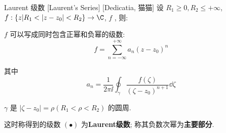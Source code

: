 \documentclass[UTF8]{ctexart}
\begin{document}
        \begin{thm}
            {Laurent 级数}
            [Laurent's Series]
            [Dedicatia, 猫猫]
            设 \(R_1\geq 0, R_2\leq+\infty\), \(f:\{z|R_1<|z-z_0|<R_2\}\to\C\), \(f\) , 则: 
            
            \(f\) 可以写成同时包含正幂和负幂的级数: 
            \[f=\sum_{n=-\infty}^{+\infty}a_n(z-z_0)^n\tag{ \(\bullet\) }\]
            
            其中
            \[a_n=\frac{1}{2\pi\ii}\oint_{\gamma}\frac{f(\zeta)}{(\zeta-z_0)^{n+1}}\dd{\zeta}\]
            
            \(\gamma\) 是 \(|\zeta-z_0|=\rho(R_1<\rho< R_2)\) 的圆周. 
            
            这时称得到的级数 \((\bullet)\) 为\textbf{Laurent级数}; 称其负数次幂为\textbf{主要部分}. 
        \end{thm}
\end{document}
